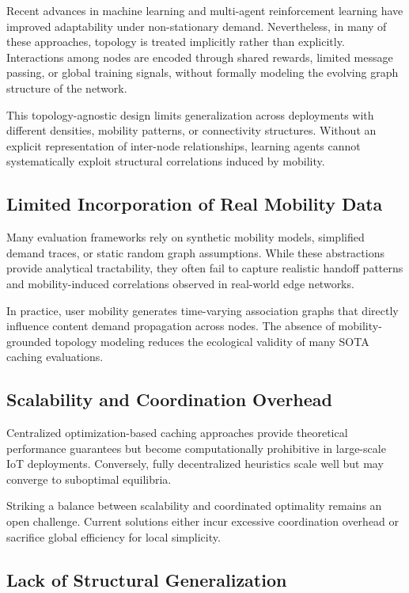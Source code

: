 Recent advances in machine learning and multi-agent reinforcement learning have improved adaptability under non-stationary demand. Nevertheless, in many of these approaches, topology is treated implicitly rather than explicitly. Interactions among nodes are encoded through shared rewards, limited message passing, or global training signals, without formally modeling the evolving graph structure of the network.

This topology-agnostic design limits generalization across deployments with different densities, mobility patterns, or connectivity structures. Without an explicit representation of inter-node relationships, learning agents cannot systematically exploit structural correlations induced by mobility.

\subsection{Limited Incorporation of Real Mobility Data}

Many evaluation frameworks rely on synthetic mobility models, simplified demand traces, or static random graph assumptions. While these abstractions provide analytical tractability, they often fail to capture realistic handoff patterns and mobility-induced correlations observed in real-world edge networks.

In practice, user mobility generates time-varying association graphs that directly influence content demand propagation across nodes. The absence of mobility-grounded topology modeling reduces the ecological validity of many SOTA caching evaluations.

\subsection{Scalability and Coordination Overhead}

Centralized optimization-based caching approaches provide theoretical performance guarantees but become computationally prohibitive in large-scale IoT deployments. Conversely, fully decentralized heuristics scale well but may converge to suboptimal equilibria.

Striking a balance between scalability and coordinated optimality remains an open challenge. Current solutions either incur excessive coordination overhead or sacrifice global efficiency for local simplicity.

\subsection{Lack of Structural Generalization}


